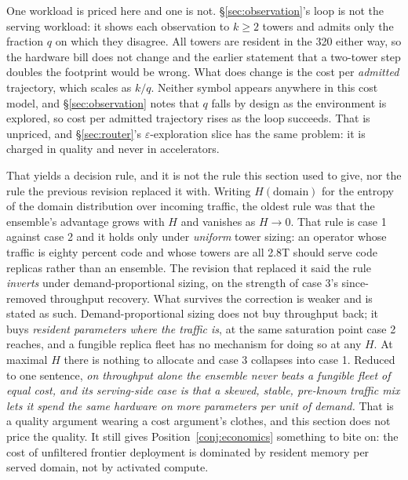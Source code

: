 \documentclass[11pt]{article}
\begin{document}
One workload is priced here and one is not. \S\ref{sec:observation}'s loop is not the serving workload: it shows each observation to $k \geq 2$ towers and admits only the fraction $q$ on which they disagree. All towers are resident in the 320 either way, so the hardware bill does not change and the earlier statement that a two-tower step doubles the footprint would be wrong. What does change is the cost per \emph{admitted} trajectory, which scales as $k/q$. Neither symbol appears anywhere in this cost model, and \S\ref{sec:observation} notes that $q$ falls by design as the environment is explored, so cost per admitted trajectory rises as the loop succeeds. That is unpriced, and \S\ref{sec:router}'s $\varepsilon$-exploration slice has the same problem: it is charged in quality and never in accelerators.

That yields a decision rule, and it is not the rule this section used to give, nor the rule the previous revision replaced it with. Writing $H(\text{domain})$ for the entropy of the domain distribution over incoming traffic, the oldest rule was that the ensemble's advantage grows with $H$ and vanishes as $H \to 0$. That rule is case 1 against case 2 and it holds only under \emph{uniform} tower sizing: an operator whose traffic is eighty percent code and whose towers are all 2.8T should serve code replicas rather than an ensemble. The revision that replaced it said the rule \emph{inverts} under demand-proportional sizing, on the strength of case 3's since-removed throughput recovery. What survives the correction is weaker and is stated as such. Demand-proportional sizing does not buy throughput back; it buys \emph{resident parameters where the traffic is}, at the same saturation point case 2 reaches, and a fungible replica fleet has no mechanism for doing so at any $H$. At maximal $H$ there is nothing to allocate and case 3 collapses into case 1. Reduced to one sentence, \emph{on throughput alone the ensemble never beats a fungible fleet of equal cost, and its serving-side case is that a skewed, stable, pre-known traffic mix lets it spend the same hardware on more parameters per unit of demand.} That is a quality argument wearing a cost argument's clothes, and this section does not price the quality. It still gives Position~\ref{conj:economics} something to bite on: the cost of unfiltered frontier deployment is dominated by resident memory per served domain, not by activated compute.
\end{document}
